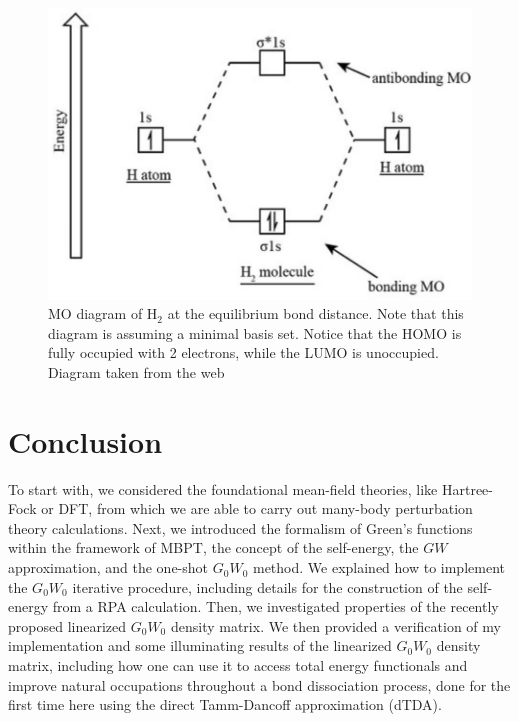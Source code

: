 \documentclass[12pt]{caltech_thesis}
\begin{document}
\begin{figure}[h]
    \centering
    \includegraphics[width=\textwidth]{h2_mo.png}
\caption{MO diagram of $\mathrm{H_2}$ at the equilibrium bond distance. Note that this diagram is assuming a minimal basis set. Notice that the HOMO is fully occupied with 2 electrons, while the LUMO is unoccupied. Diagram taken from the web \autocite{noauthor_molecular_nodate}}
\label{fig:h2_mo_diagram}
\end{figure}
\chapter{Conclusion}
    To start with, we considered the foundational mean-field theories, like Hartree-Fock or DFT, from which we are able to carry out many-body perturbation theory calculations. Next, we introduced the formalism of Green's functions within the framework of MBPT, the concept of the self-energy, the $GW$ approximation, and the one-shot $G_0W_0$ method. We explained how to implement the $G_0W_0$ iterative procedure, including details for the construction of the self-energy from a RPA calculation. Then, we investigated properties of the recently proposed linearized $G_0W_0$ density matrix\autocite{bruneval_assessment_2019}. We then provided a verification of my implementation and some illuminating results of the linearized $G_0W_0$ density matrix, including how one can use it to access total energy functionals and improve natural occupations throughout a bond dissociation process, done for the first time here using the direct Tamm-Dancoff approximation (dTDA).
\end{document}
